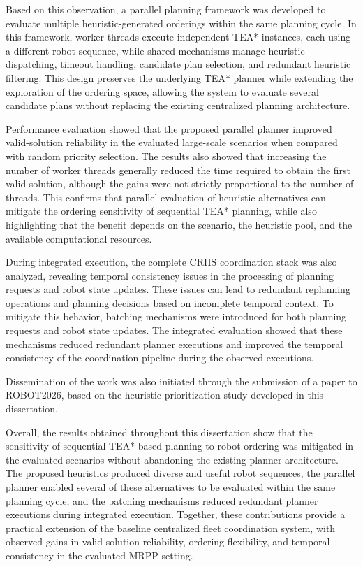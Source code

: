 Based on this observation, a parallel planning framework was developed to evaluate multiple heuristic-generated orderings within the same planning cycle. In this framework, worker threads execute independent TEA* instances, each using a different robot sequence, while shared mechanisms manage heuristic dispatching, timeout handling, candidate plan selection, and redundant heuristic filtering. This design preserves the underlying TEA* planner while extending the exploration of the ordering space, allowing the system to evaluate several candidate plans without replacing the existing centralized planning architecture.

Performance evaluation showed that the proposed parallel planner improved valid-solution reliability in the evaluated large-scale scenarios when compared with random priority selection. The results also showed that increasing the number of worker threads generally reduced the time required to obtain the first valid solution, although the gains were not strictly proportional to the number of threads. This confirms that parallel evaluation of heuristic alternatives can mitigate the ordering sensitivity of sequential TEA* planning, while also highlighting that the benefit depends on the scenario, the heuristic pool, and the available computational resources.

During integrated execution, the complete CRIIS coordination stack was also analyzed, revealing temporal consistency issues in the processing of planning requests and robot state updates. These issues can lead to redundant replanning operations and planning decisions based on incomplete temporal context. To mitigate this behavior, batching mechanisms were introduced for both planning requests and robot state updates. The integrated evaluation showed that these mechanisms reduced redundant planner executions and improved the temporal consistency of the coordination pipeline during the observed executions.

Dissemination of the work was also initiated through the submission of a paper to ROBOT2026, based on the heuristic prioritization study developed in this dissertation.

Overall, the results obtained throughout this dissertation show that the sensitivity of sequential TEA*-based planning to robot ordering was mitigated in the evaluated scenarios without abandoning the existing planner architecture. The proposed heuristics produced diverse and useful robot sequences, the parallel planner enabled several of these alternatives to be evaluated within the same planning cycle, and the batching mechanisms reduced redundant planner executions during integrated execution. Together, these contributions provide a practical extension of the baseline centralized fleet coordination system, with observed gains in valid-solution reliability, ordering flexibility, and temporal consistency in the evaluated MRPP setting.



